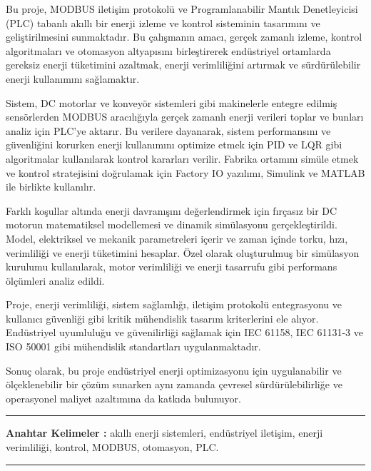 
Bu proje, MODBUS iletişim protokolü ve Programlanabilir Mantık Denetleyicisi (PLC) tabanlı akıllı bir enerji izleme ve kontrol sisteminin tasarımını ve geliştirilmesini sunmaktadır. Bu çalışmanın amacı, gerçek zamanlı izleme, kontrol algoritmaları ve otomasyon altyapısını birleştirerek endüstriyel ortamlarda gereksiz enerji tüketimini azaltmak, enerji verimliliğini artırmak ve sürdürülebilir enerji kullanımını sağlamaktır.

\vspace{3mm}

Sistem, DC motorlar ve konveyör sistemleri gibi makinelerle entegre edilmiş sensörlerden MODBUS aracılığıyla gerçek zamanlı enerji verileri toplar ve bunları analiz için PLC'ye aktarır. Bu verilere dayanarak, sistem performansını ve güvenliğini korurken enerji kullanımını optimize etmek için PID ve LQR gibi algoritmalar kullanılarak kontrol kararları verilir. Fabrika ortamını simüle etmek ve kontrol stratejisini doğrulamak için Factory IO yazılımı, Simulink ve MATLAB ile birlikte kullanılır.

\vspace{3mm}

Farklı koşullar altında enerji davranışını değerlendirmek için fırçasız bir DC motorun matematiksel modellemesi ve dinamik simülasyonu gerçekleştirildi. Model, elektriksel ve mekanik parametreleri içerir ve zaman içinde torku, hızı, verimliliği ve enerji tüketimini hesaplar. Özel olarak oluşturulmuş bir simülasyon kurulumu kullanılarak, motor verimliliği ve enerji tasarrufu gibi performans ölçümleri analiz edildi.

\medskip

Proje, enerji verimliliği, sistem sağlamlığı, iletişim protokolü entegrasyonu ve kullanıcı güvenliği gibi kritik mühendislik tasarım kriterlerini ele alıyor. Endüstriyel uyumluluğu ve güvenilirliği sağlamak için IEC 61158, IEC 61131-3 ve ISO 50001 gibi mühendislik standartları uygulanmaktadır.

\medskip

Sonuç olarak, bu proje endüstriyel enerji optimizasyonu için uygulanabilir ve ölçeklenebilir bir çözüm sunarken aynı zamanda çevresel sürdürülebilirliğe ve operasyonel maliyet azaltımına da katkıda bulunuyor.\\[0.1mm]

\noindent\rule[2pt]{\textwidth}{0.5pt}

{\textbf{Anahtar Kelimeler :}}
akıllı enerji sistemleri, endüstriyel iletişim, enerji verimliliği, kontrol, MODBUS, otomasyon, PLC.
\\
\noindent\rule[2pt]{\textwidth}{0.5pt}




